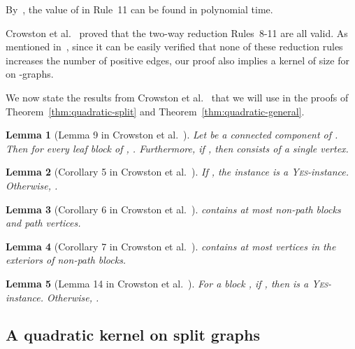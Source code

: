 \documentclass[
final
]{dmtcs-episciences}
\newtheorem{lemma}{Lemma}{\bfseries}{\itshape}
\begin{document}
\vspace{.3cm}



By~\cite[Lemma 9]{crowston2012max}, the value of  in Rule~11 can be found in polynomial time.

\vspace{.3cm}

Crowston et al.~\cite{crowston2013maximum} proved that the two-way reduction Rules~8-11 are all valid. As mentioned in~\cite{crowston2013maximum}, since it can be easily verified  that none of these  reduction rules increases the number of positive edges, our proof also implies  a kernel of size  for {} on -graphs.



We now state the results from Crowston et al.~\cite{crowston2013maximum} that we will use in the proofs of Theorem~\ref{thm:quadratic-split} and Theorem~\ref{thm:quadratic-general}.


\begin{lemma}[Lemma 9 in Crowston et al.~\cite{crowston2013maximum}]\label{Crow-Lemma-9}
Let  be a connected component of . Then for every leaf block  of , . Furthermore, if , then  consists of a single vertex.
\end{lemma}


\begin{lemma}[Corollary 5 in Crowston et al.~\cite{crowston2013maximum}]\label{Crow-Coro-5}
If , the instance is a \textsc{Yes}-instance. Otherwise, .
\end{lemma}


\begin{lemma}[Corollary 6 in Crowston et al.~\cite{crowston2013maximum}]\label{Crow-Coro-6}
  contains at most  non-path blocks and 
path vertices.
\end{lemma}

\begin{lemma}[Corollary 7 in Crowston et al.~\cite{crowston2013maximum}]\label{Crow-Coro-7}
 contains at most  vertices in the exteriors of
non-path blocks.
\end{lemma}

\begin{lemma}[Lemma 14 in Crowston et al.~\cite{crowston2013maximum}]\label{Crow-Lemma-14}
For a block , if ,
then  is a \textsc{Yes}-instance. Otherwise, .
\end{lemma}

\subsection{A quadratic kernel on split graphs}
\label{ap:quadratic-split}
\end{document}
